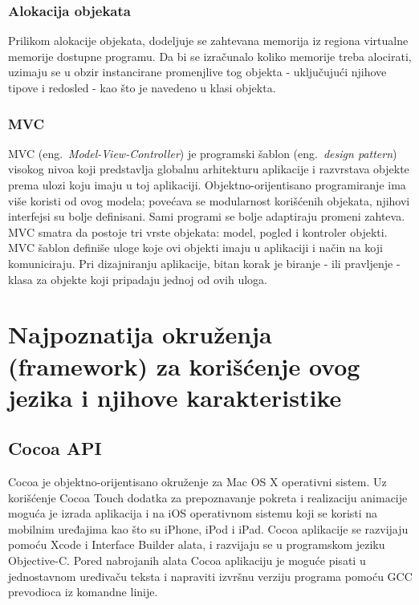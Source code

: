 \documentclass[a4paper]{article}
\begin{document}
{\subsubsection{Alokacija objekata}
Prilikom alokacije objekata, dodeljuje se zahtevana memorija iz regiona virtualne memorije dostupne programu. Da bi se izračunalo koliko memorije treba alocirati, uzimaju se u obzir instancirane promenjlive tog objekta - uključujući njihove tipove i redosled - kao što je navedeno u klasi objekta.

\subsubsection{MVC}
MVC (eng.~{\em Model-View-Controller}) je programski šablon (eng.~{\em design pattern}) visokog nivoa koji predstavlja globalnu arhitekturu aplikacije i razvrstava objekte prema ulozi koju imaju u toj aplikaciji.
Objektno-orijentisano programiranje ima više koristi od ovog modela; povećava se modularnost korišćenih objekata, njihovi interfejsi su bolje definisani. Sami programi se bolje adaptiraju promeni zahteva.
MVC smatra da postoje tri vrste objekata: model, pogled i kontroler objekti. MVC šablon definiše uloge koje ovi objekti imaju u aplikaciji i način na koji komuniciraju. Pri dizajniranju aplikacije, bitan korak je biranje - ili pravljenje - klasa za objekte koji pripadaju jednoj od ovih uloga. 
\begin{center}
\end{center}

\section{Najpoznatija okruženja (framework) za korišćenje ovog jezika i njihove karakteristike}
\label{sec:okruzenja}
\subsection{Cocoa API}
\label{sec:Cocoa}
Cocoa \cite{cocoa} je objektno-orijentisano okruženje za Mac OS X operativni sistem. Uz korišćenje Cocoa Touch dodatka za
prepoznavanje pokreta i realizaciju animacije moguća je izrada aplikacija i na iOS operativnom
sistemu koji se koristi na mobilnim uređajima kao što su iPhone, iPod i iPad.
Cocoa aplikacije se
razvijaju pomoću Xcode i Interface Builder alata, i razvijaju se u programskom jeziku Objective-C.
Pored nabrojanih alata Cocoa aplikaciju je moguće pisati u jednostavnom uređivaču teksta i
napraviti izvršnu verziju programa pomoću GCC prevodioca iz komandne linije.

}
\end{document}
